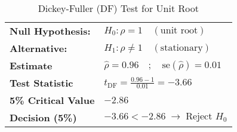 \documentclass[a4paper,12pt]{article}
\begin{document}
\begin{table}[ht!]
\centering
\caption{Dickey-Fuller (DF) Test for Unit Root}
\label{tab:DF-test}

\begin{tabular}{l l}
\toprule
\textbf{Null Hypothesis:}   & $H_0: \rho = 1 \quad (\text{unit root})$ \\
\textbf{Alternative:}       & $H_1: \rho \neq 1 \quad (\text{stationary})$ \\
\midrule
\textbf{Estimate}           & $\hat{\rho} = 0.96 \quad;\quad \mathrm{se}(\hat{\rho}) = 0.01$ \\
\textbf{Test Statistic}     & $t_{\mathrm{DF}} = \frac{0.96 - 1}{0.01} = -3.66$ \\
\textbf{5\% Critical Value} & $-2.86$ \\
\textbf{Decision (5\%)}     & $-3.66 < -2.86 \;\rightarrow\; \text{Reject } H_0$ \\
\bottomrule
\end{tabular}
\end{table}
\end{document}
